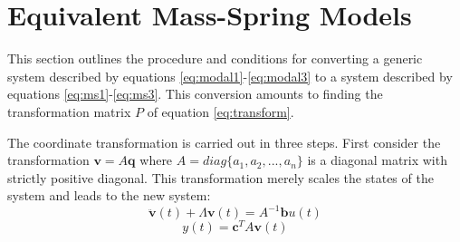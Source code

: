 \documentclass{mbd_fullpaper}
\begin{document}
\section{Equivalent Mass-Spring Models}
This section outlines the procedure and conditions for converting a generic system described by equations \ref{eq:modal1}-\ref{eq:modal3} to a system described by equations \ref{eq:ms1}-\ref{eq:ms3}.
This conversion amounts to finding the transformation matrix $P$ of equation \ref{eq:transform}.

The coordinate transformation is carried out in three steps.
First consider the transformation $\mathbf{v} = A \mathbf{q}$ where $A = diag\{a_1, a_2, ..., a_n\}$ is a diagonal matrix with strictly positive diagonal.
This transformation merely scales the states of the system and leads to the new system:
\begin{equation}
\ddot{\mathbf{v}}(t) +  \Lambda \mathbf{v}(t) =  A^{-1} \mathbf{b}u(t)
\label{eq:scaled1}
\end{equation}
\begin{equation}
y(t) = \mathbf{c}^T  A \mathbf{v}(t)
\label{eq:scaled2}
\end{equation}
\end{document}
